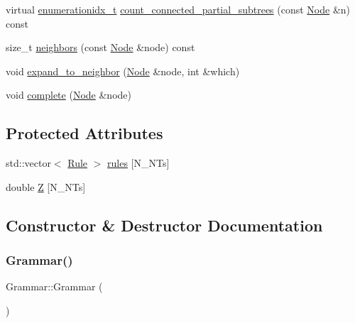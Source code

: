 \begin{DoxyCompactItemize}
\item 
virtual \hyperlink{_numerics_8h_a9fe2bbca873b046b2bd276fc6856bb88}{enumerationidx\+\_\+t} \hyperlink{class_grammar_ad56da50581cbebe1427ebf2f73018328}{count\+\_\+connected\+\_\+partial\+\_\+subtrees} (const \hyperlink{class_node}{Node} \&n) const
\item 
size\+\_\+t \hyperlink{class_grammar_ae9115c2743b054ec44ef513843d84f5d}{neighbors} (const \hyperlink{class_node}{Node} \&node) const
\item 
void \hyperlink{class_grammar_abd380ec308907ddc26acb22196610b83}{expand\+\_\+to\+\_\+neighbor} (\hyperlink{class_node}{Node} \&node, int \&which)
\item 
void \hyperlink{class_grammar_a68f767b06f9675461be94242c89dfdb9}{complete} (\hyperlink{class_node}{Node} \&node)
\end{DoxyCompactItemize}
\subsection*{Protected Attributes}
\begin{DoxyCompactItemize}
\item 
std\+::vector$<$ \hyperlink{class_rule}{Rule} $>$ \hyperlink{class_grammar_aae1036bcd35025ff7512252c7aa06e9c}{rules} \mbox{[}N\+\_\+\+N\+Ts\mbox{]}
\item 
double \hyperlink{class_grammar_af55b1376566113fecd05b2c99b9f0014}{Z} \mbox{[}N\+\_\+\+N\+Ts\mbox{]}
\end{DoxyCompactItemize}


\subsection{Constructor \& Destructor Documentation}
\mbox{\label{class_grammar_aa201250a002a7d07d398fee189a74427}} 
\subsubsection{\texorpdfstring{Grammar()}{Grammar()}\hspace{0.1cm}{\footnotesize\ttfamily [1/4]}}
{\footnotesize\ttfamily Grammar\+::\+Grammar (\begin{DoxyParamCaption}{ }\end{DoxyParamCaption})\hspace{0.3cm}{\ttfamily [inline]}}

